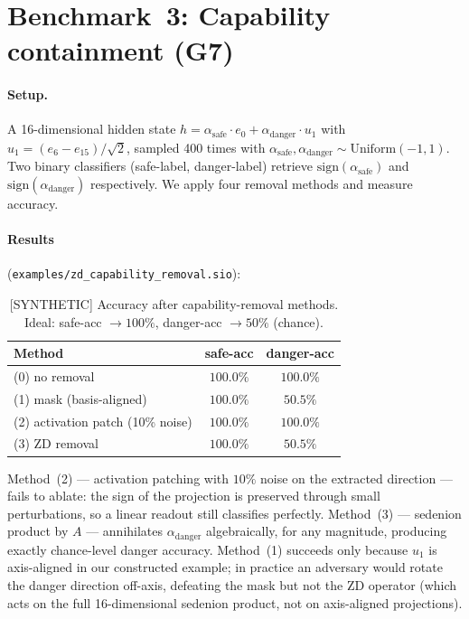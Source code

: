 \documentclass{article}
\begin{document}
\section{Benchmark~3: Capability containment (G7)}

\paragraph{Setup.}  A 16-dimensional hidden state $h = \alpha_\text{safe}
\cdot e_0 + \alpha_\text{danger} \cdot u_1$ with $u_1 = (e_6 - e_{15})/\sqrt{2}$,
sampled 400 times with $\alpha_\text{safe}, \alpha_\text{danger} \sim
\mathrm{Uniform}(-1,1)$.  Two binary classifiers (safe-label,
danger-label) retrieve $\mathrm{sign}(\alpha_\text{safe})$ and
$\mathrm{sign}(\alpha_\text{danger})$ respectively.  We apply four removal
methods and measure accuracy.

\paragraph{Results} (\texttt{examples/zd\_capability\_removal.sio}):

\begin{table}[h]
\centering
\caption{[SYNTHETIC] Accuracy after capability-removal methods.  Ideal: safe-acc $\to
100\%$, danger-acc $\to 50\%$ (chance).}
\label{tab:capability}
\begin{tabular}{@{}lcc@{}}
\toprule
Method & safe-acc & danger-acc \\
\midrule
(0) no removal             & $100.0\%$ & $100.0\%$ \\
(1) mask (basis-aligned)   & $100.0\%$ & $50.5\%$ \\
(2) activation patch (10\% noise) & $100.0\%$ & $100.0\%$ \\
(3) ZD removal             & $100.0\%$ & $\mathbf{50.5\%}$ \\
\bottomrule
\end{tabular}
\end{table}

Method~(2) --- activation patching with $10\%$ noise on the extracted
direction --- fails to ablate: the sign of the projection is preserved
through small perturbations, so a linear readout still classifies
perfectly.  Method~(3) --- sedenion product by $A$ --- annihilates
$\alpha_\text{danger}$ algebraically, for any magnitude, producing
exactly chance-level danger accuracy.  Method~(1) succeeds only because
$u_1$ is axis-aligned in our constructed example; in practice an
adversary would rotate the danger direction off-axis, defeating the mask
but not the ZD operator (which acts on the full 16-dimensional sedenion
product, not on axis-aligned projections).
\end{document}
